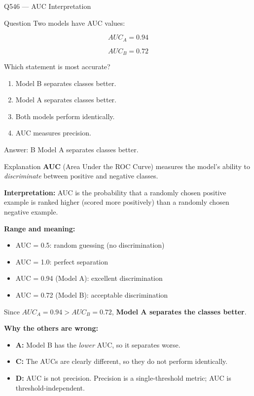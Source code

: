 \documentclass[aspectratio=169,8pt]{beamer}
\begin{document}
	\begin{frame}{Q546 --- AUC Interpretation}
		\begin{block}{Question}
			Two models have AUC values:
			
			\[
			AUC_A = 0.94
			\]
			
			\[
			AUC_B = 0.72
			\]
			
			Which statement is most accurate?
			
			\begin{enumerate}
				\item Model B separates classes better.
				\item Model A separates classes better.
				\item Both models perform identically.
				\item AUC measures precision.
			\end{enumerate}
		\end{block}
		
		\begin{exampleblock}{Answer: B}
			Model A separates classes better.
		\end{exampleblock}
		
		\begin{block}{Explanation}
			\textbf{AUC} (Area Under the ROC Curve) measures the model's ability to
			\emph{discriminate} between positive and negative classes.
			
			\textbf{Interpretation:} AUC is the probability that a randomly chosen
			positive example is ranked higher (scored more positively) than a randomly
			chosen negative example.
			
			\textbf{Range and meaning:}
			\begin{itemize}
				\item AUC = 0.5: random guessing (no discrimination)
				\item AUC = 1.0: perfect separation
				\item AUC = 0.94 (Model A): excellent discrimination
				\item AUC = 0.72 (Model B): acceptable discrimination
			\end{itemize}
			
			Since \(AUC_A = 0.94 > AUC_B = 0.72\), \textbf{Model A separates the classes
				better}.
			
			\textbf{Why the others are wrong:}
			\begin{itemize}
				\item \textbf{A:} Model B has the \emph{lower} AUC, so it separates worse.
				\item \textbf{C:} The AUCs are clearly different, so they do not perform identically.
				\item \textbf{D:} AUC is not precision. Precision is a single-threshold
				metric; AUC is threshold-independent.
			\end{itemize}
		\end{block}
	\end{frame}
	
\end{document}
